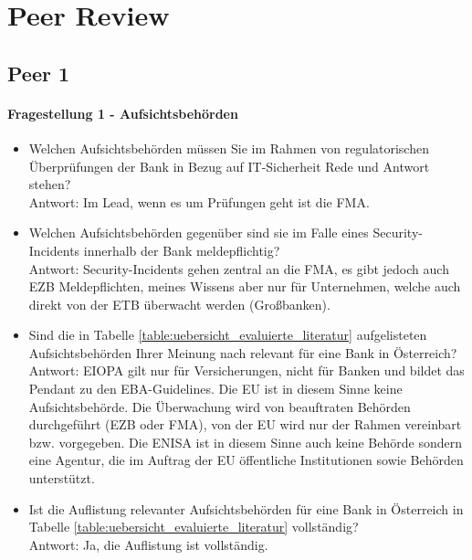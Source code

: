 \chapter{Peer Review}
\label{app:Peer Review}

\section{Peer 1}
\subsubsection{Fragestellung 1 - Aufsichtsbehörden}
\begin{itemize}
    \item Welchen Aufsichtsbehörden müssen Sie im Rahmen von regulatorischen Überprüfungen der Bank in Bezug auf IT-Sicherheit Rede und Antwort stehen?\\
    Antwort: Im Lead, wenn es um Prüfungen geht ist die FMA.\\
    \item Welchen Aufsichtsbehörden gegenüber sind sie im Falle eines Security-Incidents innerhalb der Bank meldepflichtig?\\
    Antwort: Security-Incidents gehen zentral an die FMA, es gibt jedoch auch EZB Meldepflichten, meines Wissens aber nur für Unternehmen, welche auch direkt von der ETB überwacht werden (Großbanken). \\
    \item Sind die in Tabelle \ref{table:uebersicht_evaluierte_literatur} aufgelisteten Aufsichtsbehörden Ihrer Meinung nach relevant für eine Bank in Österreich?\\
    Antwort: EIOPA gilt nur für Versicherungen, nicht für Banken und bildet das Pendant zu den EBA-Guidelines. Die EU ist in diesem Sinne keine Aufsichtsbehörde. Die Überwachung wird von beauftraten Behörden durchgeführt (EZB oder FMA), von der EU wird nur der Rahmen vereinbart bzw. vorgegeben. Die ENISA ist in diesem Sinne auch keine Behörde sondern eine Agentur, die im Auftrag der EU öffentliche Institutionen sowie Behörden unterstützt. \\
    \item Ist die Auflistung relevanter Aufsichtsbehörden für eine Bank in Österreich in Tabelle \ref{table:uebersicht_evaluierte_literatur} vollständig?\\
    Antwort: Ja, die Auflistung ist vollständig.\\
\end{itemize}
